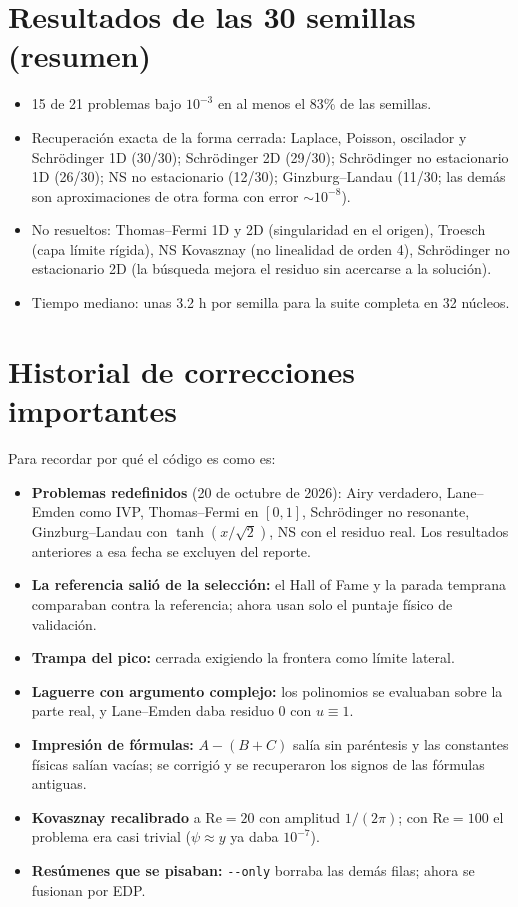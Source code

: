 \documentclass[11pt,a4paper]{article}
\newcommand{\code}[1]{\texttt{\small #1}}
\begin{document}
\section{Resultados de las 30 semillas (resumen)}
\begin{itemize}
\item 15 de 21 problemas bajo $10^{-3}$ en al menos el 83\% de las semillas.
\item Recuperación exacta de la forma cerrada: Laplace, Poisson, oscilador y Schrödinger 1D (30/30);
  Schrödinger 2D (29/30); Schrödinger no estacionario 1D (26/30); NS no estacionario (12/30);
  Ginzburg--Landau (11/30; las demás son aproximaciones de otra forma con error $\sim10^{-8}$).
\item No resueltos: Thomas--Fermi 1D y 2D (singularidad en el origen), Troesch (capa límite rígida),
  NS Kovasznay (no linealidad de orden 4), Schrödinger no estacionario 2D (la búsqueda mejora el
  residuo sin acercarse a la solución).
\item Tiempo mediano: unas 3.2 h por semilla para la suite completa en 32 núcleos.
\end{itemize}

\section{Historial de correcciones importantes}
Para recordar por qué el código es como es:
\begin{itemize}
\item \textbf{Problemas redefinidos} (20 de octubre de 2026): Airy verdadero, Lane--Emden como IVP,
  Thomas--Fermi en $[0,1]$, Schrödinger no resonante, Ginzburg--Landau con $\tanh(x/\sqrt2)$, NS con el
  residuo real. Los resultados anteriores a esa fecha se excluyen del reporte.
\item \textbf{La referencia salió de la selección:} el Hall of Fame y la parada temprana comparaban
  contra la referencia; ahora usan solo el puntaje físico de validación.
\item \textbf{Trampa del pico:} cerrada exigiendo la frontera como límite lateral.
\item \textbf{Laguerre con argumento complejo:} los polinomios se evaluaban sobre la parte real, y
  Lane--Emden daba residuo 0 con $u\equiv1$.
\item \textbf{Impresión de fórmulas:} $A-(B+C)$ salía sin paréntesis y las constantes físicas salían
  vacías; se corrigió y se recuperaron los signos de las fórmulas antiguas.
\item \textbf{Kovasznay recalibrado} a $\mathrm{Re}=20$ con amplitud $1/(2\pi)$; con $\mathrm{Re}=100$ el
  problema era casi trivial ($\psi\approx y$ ya daba $10^{-7}$).
\item \textbf{Resúmenes que se pisaban:} \code{-{}-only} borraba las demás filas; ahora se fusionan por EDP.
\end{itemize}
\end{document}
